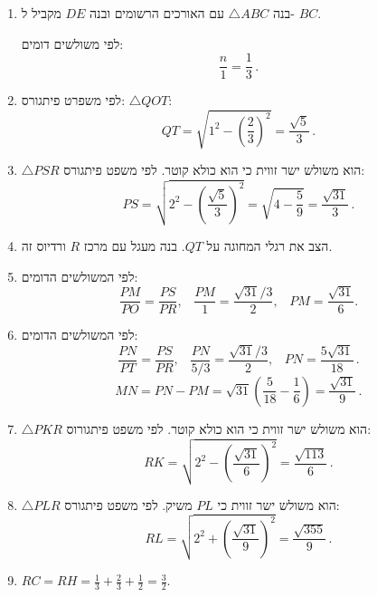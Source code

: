 \documentclass[12pt,a4paper]{article}
\begin{document}
\begin{enumerate}

\item
בנה
$\triangle ABC$
עם האורכים הרשומים ובנה 
$DE$
מקביל ל-%
$BC$. 
\begin{center}
\end{center}
לפי משולשים דומים:
\[
\frac{n}{1} = \frac{1}{3}\,.
\]
\item
לפי משפרט פיתגורס:
$\triangle QOT$:
\[
QT = \sqrt{1^2-\left(\frac{2}{3}\right)^2}=\frac{\sqrt{5}}{3}\,.
\]

\item $\triangle PSR$
הוא משולש ישר זווית כי הוא כולא קוטר. לפי משפט פיתגורס:
\[
PS = \sqrt{2^2-\left(\frac{\sqrt{5}}{3}\right)^2}=\sqrt{4-\frac{5}{9}}=\frac{\sqrt{31}}{3}\,.
\]

\item
הצב את רגלי המחוגה על 
$QT$.
בנה מעגל עם מרכז 
$R$
ורדיוס זה.

\item
לפי המשולשים הדומים:
\[
\frac{PM}{PO}=\frac{PS}{PR},\;\;\;\frac{PM}{1}=\frac{\sqrt{31}/3}{2},\;\;\;PM=\frac{\sqrt{31}}{6}.
\]

\item
לפי המשולשים הדומים:
\[
\frac{PN}{PT}=\frac{PS}{PR},\;\;\;\frac{PN}{5/3}=\frac{\sqrt{31}/3}{2},\;\;\;PN=\frac{5\sqrt{31}}{18}\,.
\]
\[
MN=PN-PM = \sqrt{31}\left(\frac{5}{18}-\frac{1}{6}\right) = \frac{\sqrt{31}}{9}\,.
\]

\item $\triangle PKR$
הוא משולש ישר זווית כי הוא כולא קוטר. לפי משפט פיתגורוס:
\[
RK=\sqrt{2^2-\left(\frac{\sqrt{31}}{6}\right)^2} = \frac{\sqrt{113}}{6}\,.
\]

\item $\triangle PLR$
הוא משולש ישר זווית כי
$PL$
משיק. לפי משפט פיתגורס:
\[
RL=\sqrt{2^2+\left(\frac{\sqrt{31}}{9}\right)^2} = \frac{\sqrt{355}}{9}\,.
\]

\item $RC=RH=\displaystyle\frac{1}{3}+\frac{2}{3}+\frac{1}{2}=\frac{3}{2}$.


\end{enumerate}
\end{document}
